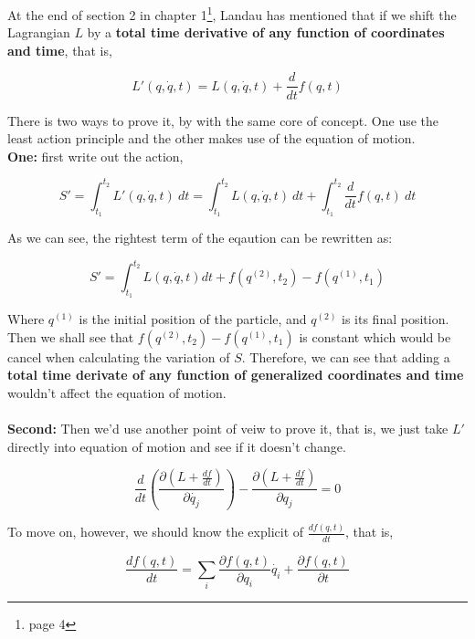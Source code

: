 \documentclass[12pt]{article}
\numberwithin{equation}{section}
\begin{document}
At the end of section 2 in chapter 1\footnote{page 4}, Landau has mentioned that if we shift the Lagrangian $L$ by a \textbf{total time derivative of any function of coordinates and time}, that is,

\begin{center}
    \[L'(q, \dot{q}, t) = L(q, \dot{q}, t) + \frac{d}{dt}f(q, t)\]
\end{center}

There is two ways to prove it, by with the same core of concept. One use the least action principle and the other makes use of the equation of motion.
\\
\textbf{One:} first write out the action,

\begin{center}
    \[S' = \int_{t_1}^{t_2} L'(q, \dot{q}, t)\ dt = \int_{t_1}^{t_2} L(q, \dot{q}, t)\ dt + \int_{t_1}^{t_2} \frac{d}{dt}f(q, t)\ dt\]
\end{center}

As we can see, the rightest term of the eqaution can be rewritten as:

\begin{center}
    \[S' = \int_{t_1}^{t_2} L(q, \dot{q}, t) dt + f(q^{(2)}, t_2) - f(q^{(1)}, t_1)\]
\end{center}

Where $q^{(1)}$ is the initial position of the particle, and $q^{(2)}$ is its final position. Then we shall see that $f(q^{(2)}, t_2) - f(q^{(1)}, t_1)$ is constant which would be cancel when calculating the variation of $S$. Therefore, we can see that adding a \textbf{total time derivate of any function of generalized coordinates and time }wouldn't affect the equation of motion.
\\\\
\textbf{Second:}  Then we'd use another point of veiw to prove it, that is, we just take $L'$ directly into equation of motion and see if it doesn't change.

\begin{center}
    \[ \frac{d}{dt} \left( \frac{ \partial{(L + \frac{df}{dt})} }{\partial{\dot{q_j}}} \right) - \frac{ \partial{(L+\frac{df}{dt})} }{ \partial{q_j} } = 0 \]
\end{center}

To move on, however, we should  know the explicit of $\frac{df(q, t)}{dt}$, that is,

\begin{center}
    \[ \frac{df(q, t)}{dt} = \sum_{i} \frac{ \partial{f(q, t)} }{ \partial{q_i} }\dot{q_i} + \frac{ \partial{f(q, t)} }{ \partial{t} } \]
\end{center}
\end{document}
